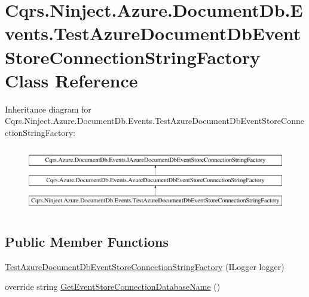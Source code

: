 \hypertarget{classCqrs_1_1Ninject_1_1Azure_1_1DocumentDb_1_1Events_1_1TestAzureDocumentDbEventStoreConnectionStringFactory}{}\section{Cqrs.\+Ninject.\+Azure.\+Document\+Db.\+Events.\+Test\+Azure\+Document\+Db\+Event\+Store\+Connection\+String\+Factory Class Reference}
\label{classCqrs_1_1Ninject_1_1Azure_1_1DocumentDb_1_1Events_1_1TestAzureDocumentDbEventStoreConnectionStringFactory}
Inheritance diagram for Cqrs.\+Ninject.\+Azure.\+Document\+Db.\+Events.\+Test\+Azure\+Document\+Db\+Event\+Store\+Connection\+String\+Factory\+:\begin{figure}[H]
\begin{center}
\leavevmode
\includegraphics[height=2.891566cm]{classCqrs_1_1Ninject_1_1Azure_1_1DocumentDb_1_1Events_1_1TestAzureDocumentDbEventStoreConnectionStringFactory}
\end{center}
\end{figure}
\subsection*{Public Member Functions}
\begin{DoxyCompactItemize}
\item 
\hyperlink{classCqrs_1_1Ninject_1_1Azure_1_1DocumentDb_1_1Events_1_1TestAzureDocumentDbEventStoreConnectionStringFactory_ab9c02577f0f7b3b43d5d4d53a9755894_ab9c02577f0f7b3b43d5d4d53a9755894}{Test\+Azure\+Document\+Db\+Event\+Store\+Connection\+String\+Factory} (I\+Logger logger)
\item 
override string \hyperlink{classCqrs_1_1Ninject_1_1Azure_1_1DocumentDb_1_1Events_1_1TestAzureDocumentDbEventStoreConnectionStringFactory_a85b4e6cd45d285be6de5db19148118b9_a85b4e6cd45d285be6de5db19148118b9}{Get\+Event\+Store\+Connection\+Database\+Name} ()
\end{DoxyCompactItemize}

